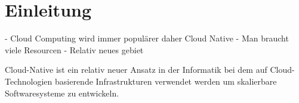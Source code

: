 \chapter{Einleitung}

- Cloud Computing wird immer populärer daher Cloud Native
- Man braucht viele Resourcen
- Relativ neues gebiet

Cloud-Native ist ein relativ neuer Ansatz in der Informatik bei dem auf Cloud-Technologien basierende Infrastrukturen verwendet werden um skalierbare Softwaresysteme zu entwickeln. 